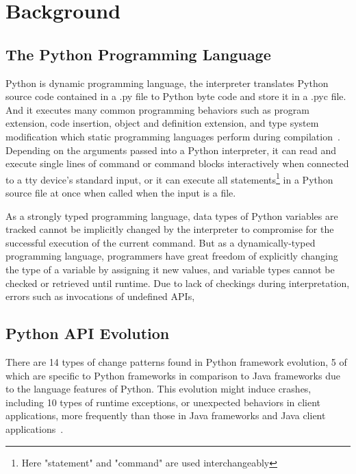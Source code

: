 \chapter{Background}
\label{chap:background}

\section{The Python Programming Language}

Python is dynamic programming language, the interpreter translates Python source code contained in a .py file to Python byte code and store it in a .pyc file. And it executes many common programming behaviors such as program extension, code insertion, object and definition extension, and type system modification which static programming languages perform during compilation~\cite{enwiki:dpl}. Depending on the arguments passed into a Python interpreter, it can read and execute single lines of command or command blocks interactively when connected to a tty device's standard input, or it can execute all statements\footnote{Here "statement" and "command" are used interchangeably} in a Python source file at once when called when the input is a file.

As a strongly typed programming language, data types of Python variables are tracked cannot be implicitly changed by the interpreter to compromise for the successful execution of the current command. But as a dynamically-typed programming language, programmers have great freedom of explicitly changing the type of a variable by assigning it new values, and variable types cannot be checked or retrieved until runtime. Due to lack of checkings during interpretation, errors such as invocations of undefined APIs, 

\section{Python API Evolution}

There are 14 types of change patterns found in Python framework evolution, 5 of which are specific to Python frameworks in comparison to Java frameworks due to the language features of Python. This evolution might induce crashes, including 10 types of runtime exceptions, or unexpected behaviors in client applications, more frequently than those in Java frameworks and Java client applications~\cite{DBLP:conf/wcre/ZhangZWTLX20}.

